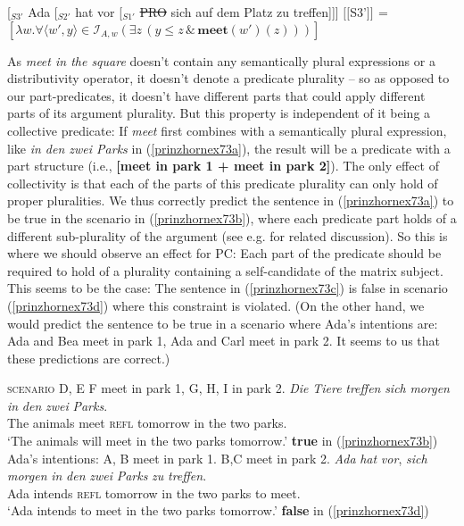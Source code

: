 \documentclass[output=paper,colorlinks,citecolor=brown,
]{langscibook}
\newcommand{\sem}[2]{\mbox{$[\![${#2}$]\!]^{#1}$}} %
\begin{document}
\ea
\ea   \label{prinzhornex72a} [$_{S3'}$ Ada [$_{S2'}$ hat vor [$_{S1'}$ \sout{PRO} sich auf dem Platz zu treffen]]]
\ex \sem{}{S3'} =  $[\lambda w.  \forall \langle w' ,y \rangle \in \mathcal{I}_{A,w} (\exists z \, (y \le z\, \& \,\textbf{meet}(w')(z)))]$\label{prinzhornex72b}
\z\z

As \textit{meet in the square} doesn't contain any semantically plural expressions or a distributivity operator, it doesn't denote a predicate plurality -- so as opposed to our part-predicates, it doesn't have different parts that could apply different parts of its argument plurality. But this property is independent of it being a collective predicate: If \textit{meet} first combines with a semantically plural expression,  like \textit{in den zwei Parks} in (\ref{prinzhornex73a}), the result will be a predicate with a part structure (i.e., \textbf{[meet in park 1 + meet in park 2]}). The only effect of collectivity is that each of the parts of this predicate plurality can only hold of proper pluralities. We  thus correctly predict the sentence in (\ref{prinzhornex73a}) to be true in the scenario in (\ref{prinzhornex73b}), where each predicate part holds of a different sub-plurality of the argument (see e.g. \citealt{Schwarzschild:1996} for related discussion). So this is where we should observe an effect for PC: Each part of the predicate should  be required to hold of a plurality containing a self-candidate of the matrix subject. This  seems to be the case: The sentence in (\ref{prinzhornex73c}) is false in scenario (\ref{prinzhornex73d}) where this constraint is violated. (On the other hand, we would predict the sentence to be true in a scenario where Ada's intentions are: Ada and Bea meet in park 1, Ada and Carl meet in park 2. It seems to us that these predictions are correct.)

\ea 
\ea \textsc{scenario}  D, E F meet in park 1, G, H, I in  park 2.  \label{prinzhornex73b}
\ex \gll \textit{Die} \textit{Tiere} \textit{treffen} \textit{sich} \textit{morgen} \textit{in} \textit{den} \textit{zwei} \textit{Parks}.\\
The animals meet \textsc{refl} tomorrow in the two parks.\\
\glt `The animals will meet in the two parks tomorrow.'  \phantom{.}\hfill \textbf{true} in (\ref{prinzhornex73b})\label{prinzhornex73a}
\ex Ada's intentions: A, B meet in park 1. B,C meet in park 2. \label{prinzhornex73d}
\ex \gll \textit{Ada} \textit{hat} \textit{vor}, \textit{sich} \textit{morgen} \textit{in} \textit{den} \textit{zwei} \textit{Parks} \textit{zu} \textit{treffen}.\\
Ada intends {} \textsc{refl} tomorrow in the two parks to meet.\\
\glt `Ada intends to meet in the two parks tomorrow.' \label{prinzhornex73c} \phantom{.}\hfill \textbf{false} in (\ref{prinzhornex73d})
\z\z
\end{document}
